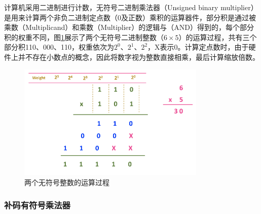 计算机采用二进制进行计数，无符号二进制乘法器（Unsigned binary multiplier）是用来计算两个非负二进制定点数（0及正数）乘积的运算器件，部分积是通过被乘数（Multiplicand）和乘数（Multiplier）的逻辑与（AND）得到的，每个部分积的权重不同，图\ref{EM:Fig:unsigned_mul_PP_gen}展示了两个无符号二进制整数（$6\times5$）的运算过程，共有三个部分积110、000、110，权重依次为$2^0$、$2^1$、$2^2$，X表示0。计算定点数时，由于硬件上并不存在小数点的概念，因此将数字视为整数直接相乘，最后计算缩放倍数。
\begin{figure}[!htb]
    \centering
    \includegraphics[width=0.8\textwidth]{figs/EM-Fig-unsigned_mul_PP.png}
    \caption{两个无符号整数的运算过程}
    \label{EM:Fig:unsigned_mul_PP_gen}
\end{figure}




\subsubsection{补码有符号乘法器}

